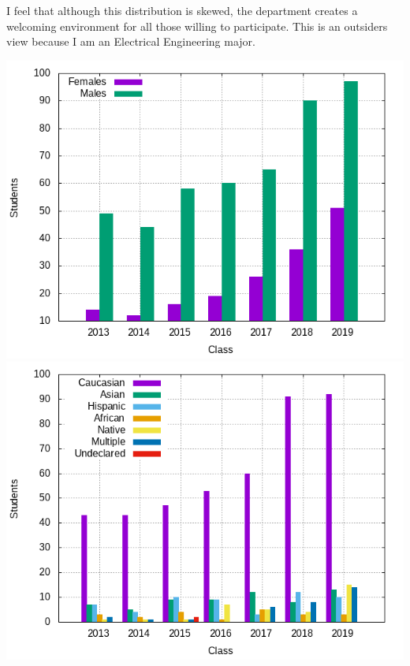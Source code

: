 \documentclass[12pt, letterpaper, twoside]{article}
\begin{document}
I feel that although this distribution is skewed, the department creates a
welcoming environment for all those willing to participate.  This is an
outsiders view because I am an Electrical Engineering major.


\includegraphics{gender}
\includegraphics{ethnic}

\end{document}
